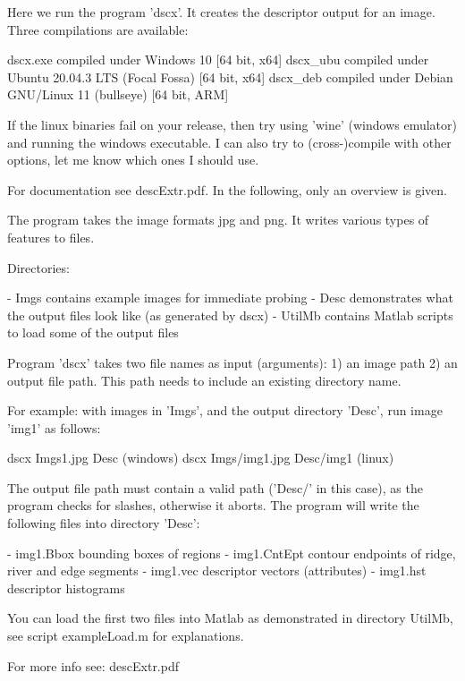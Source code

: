 Here we run the program 'dscx'. It creates the descriptor output for an image. Three
compilations are available:

dscx.exe    compiled under Windows 10                       [64 bit, x64]
dscx_ubu    compiled under Ubuntu 20.04.3 LTS (Focal Fossa) [64 bit, x64]
dscx_deb    compiled under Debian GNU/Linux 11 (bullseye)   [64 bit, ARM]

If the linux binaries fail on your release, then try using 'wine' (windows emulator)
and running the windows executable. I can also try to (cross-)compile with other
options, let me know which ones I should use.




For documentation see descExtr.pdf. In the following, only an overview is given.

The program takes the image formats jpg and png. It writes various types of features
to files.

Directories: 

- Imgs	 contains example images for immediate probing
- Desc   demonstrates what the output files look like (as generated by dscx) 
- UtilMb contains Matlab scripts to load some of the output files

Program 'dscx' takes two file names as input (arguments):
   1) an image path
   2) an output file path. This path needs to include an existing directory name.

For example: with images in 'Imgs', and the output directory 'Desc', run image 'img1'
as follows:

   dscx Imgs\img1.jpg Desc	   (windows)
   dscx Imgs/img1.jpg Desc/img1	   (linux)

The output file path must contain a valid path ('Desc/' in this case), as the
program checks for slashes, otherwise it aborts. The program will write the
following files into directory 'Desc':

    - img1.Bbox	    bounding boxes of regions
    - img1.CntEpt   contour endpoints of ridge, river and edge segments 
    - img1.vec	    descriptor vectors (attributes)
    - img1.hst	    descriptor histograms

You can load the first two files into Matlab as demonstrated in directory UtilMb,
see script exampleLoad.m for explanations.

For more info see: descExtr.pdf


